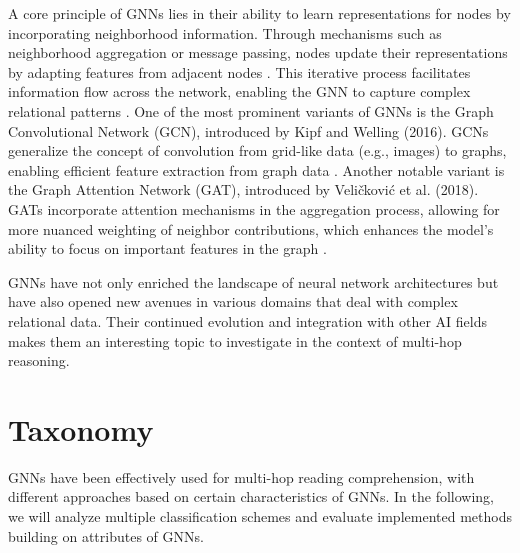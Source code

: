 \documentclass[sigplan,screen]{acmart}
\begin{document}
A core principle of GNNs lies in their ability to learn representations for nodes by incorporating neighborhood information. Through mechanisms such as neighborhood aggregation or message passing, nodes update their 
representations by adapting features from adjacent nodes \cite{RN207}. This iterative process facilitates information flow across the network, enabling the GNN to capture complex 
relational patterns \cite{RN15}. One of the most prominent variants of GNNs is the Graph Convolutional Network (GCN), introduced by Kipf and Welling (2016). 
GCNs generalize the concept of convolution from grid-like data (e.g., images) to graphs, enabling efficient feature extraction from graph data \cite{RN209}. Another notable variant is the 
Graph Attention Network (GAT), introduced by Veličković et al. (2018). GATs incorporate attention mechanisms in the aggregation process, allowing for more nuanced weighting of neighbor contributions, which 
enhances the model's ability to focus on important features in the graph \cite{RN7}.

GNNs have not only enriched the landscape of neural network architectures but have also opened new avenues in various domains that deal with complex relational data. Their continued evolution and integration with other AI fields makes them an interesting topic to investigate in the context of multi-hop reasoning.

\section{Taxonomy}
GNNs have been effectively used for multi-hop reading comprehension, with different approaches based on certain characteristics of GNNs. In
the following, we will analyze multiple classification schemes and evaluate implemented methods building on attributes of GNNs. 
\end{document}
